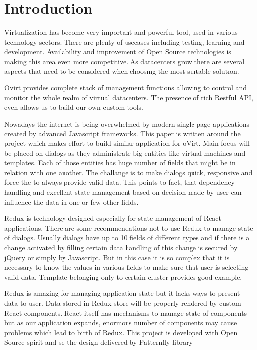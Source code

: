 
\chapter{Introduction}
Virtualization has become very important and powerful tool, used in various technology sectors. There are plenty of usecases including testing, learning and development. Availability and improvement of Open Source technologies is making this area even more competitive. As datacenters grow there are several aspects that need to be considered when choosing the most suitable solution.

Ovirt provides complete stack of management functions allowing to control and monitor the whole realm of virtual datacenters. The presence of rich Restful API, even allows us to build our own custom tools. 

Nowadays the internet is being overwhelmed by modern single page applications created by advanced Javascript frameworks. This paper is written around the project which makes effort to build similar application for oVirt. Main focus will be placed on dialogs as they administrate big entities like virtual machines and templates. Each of those entities has huge number of fields that might be in relation with one another. The challange is to make dialogs quick, responsive and force the to always provide valid data. This points to fact, that dependency handling and excellent state management based on decision made by user can influence the data in one or few other fields.

Redux is technology designed especially for state management of React \cite{React} applications. There are some recommendations not to use Redux to manage state of dialogs. Usually dialogs have up to 10 fields of different types and if there is a change activated by filling certain data handling of this change is secured by jQuery or simply by Javascript. But in this case it is so complex that it is necessary to know the values in various fields to make sure that user is selecting valid data. Template belonging only to certain cluster provides good example.

Redux is amazing for managing application state but it lacks ways to present data to user. Data stored in Redux store will be properly rendered by custom React components. React itself has mechanisms to manage state of components but as our application expands, enormous number of components may cause problems which lead to birth of Redux. This project is developed with Open Source spirit and so the design delivered by Patternfly library.


